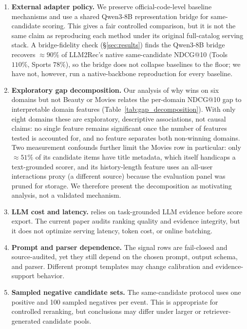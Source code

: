 \begin{enumerate}
    reliability signal---not as a validated ranking-improvement mechanism.
    \item \textbf{External adapter policy.}\label{lim:backbone} We preserve
    official-code-level
    baseline mechanisms and use a shared Qwen3-8B representation bridge for
    same-candidate scoring. This gives a fair controlled comparison, but it is
    not the same claim as reproducing each method under its original full-catalog
    serving stack. A bridge-fidelity check (\S\ref{sec:results}) finds the
    Qwen3-8B bridge recovers $\approx\!90\%$ of LLM2Rec's native same-candidate
    NDCG@10 (Tools $110\%$, Sports $78\%$), so the bridge does not collapse
    baselines to the floor; we have not, however, run a native-backbone
    reproduction for every baseline.
    \item \textbf{Exploratory gap decomposition.} Our analysis of why \method{}
    wins on six domains but not Beauty or Movies relates the per-domain NDCG@10
    gap to interpretable domain features (Table~\ref{tab:gap_decomposition}).
    With only eight domains these are exploratory, descriptive associations, not
    causal claims: no single feature remains significant once the number of
    features tested is accounted for, and no feature separates both non-winning
    domains. Two measurement confounds further limit the Movies row in
    particular: only $\approx\!51\%$ of its candidate items have title metadata,
    which itself handicaps a text-grounded scorer, and its history-length
    feature uses an all-user interactions proxy (a different source) because the
    evaluation panel was pruned for storage. We therefore present the
    decomposition as motivating analysis, not a validated mechanism.
    \item \textbf{LLM cost and latency.} \method{} relies on task-grounded LLM
    evidence before score export. The current paper audits ranking quality and
    evidence integrity, but it does not optimize serving latency, token cost, or
    online batching.
    \item \textbf{Prompt and parser dependence.} The signal rows are
    fail-closed and source-audited, yet they still depend on the chosen prompt,
    output schema, and parser. Different prompt templates may change
    calibration and evidence-support behavior.
    \item \textbf{Sampled negative candidate sets.} The same-candidate protocol
    uses one positive and 100 sampled negatives per event. This is appropriate
    for controlled reranking, but conclusions may differ under larger or
    retriever-generated candidate pools.
\end{enumerate}
